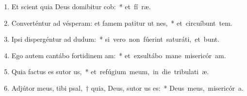 \begin{flushleft}
\begin{enumerate}[leftmargin=*]
\item Et scient quia Deus domibitur cob:~* \mbox{et fí ræ.}
\item Converténtur ad vésperam: et famem patitur ut nes,~* \mbox{et circuíbunt tem.}
\item Ipsi dispergéntur ad dudum:~* \mbox{si vero non fúerint saturáti, et bunt.}
\item Ego autem cantábo fortidinem am:~* \mbox{et exsultábo mane misericór am.}
\item Quia factus es sutor us,~* \mbox{et refúgium meum, in die tribulati æ.}
\item Adjútor meus, tibi psal,~† quia, Deus, sutor us es:~* \mbox{Deus meus, misericór a.}


\end{enumerate}
\end{flushleft}

